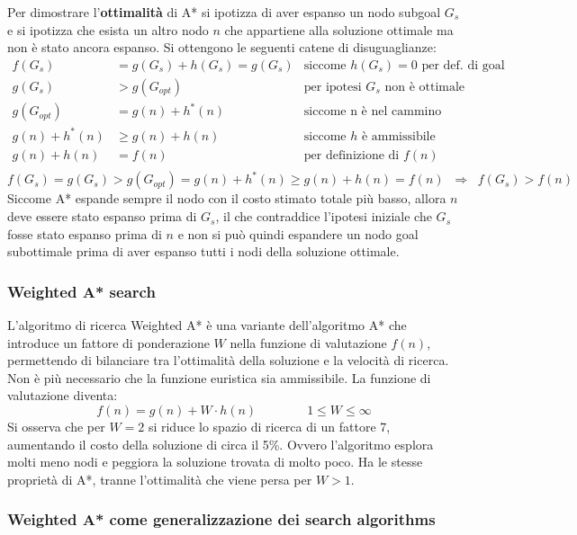 Per dimostrare l'\textbf{ottimalità} di A* si ipotizza di aver espanso un nodo subgoal \(G_s\) e si ipotizza che esista un altro
nodo \(n\) che appartiene alla soluzione ottimale ma non è stato ancora espanso. Si ottengono le seguenti catene di disuguaglianze:
\begin{align*}
	f(G_s) &= g(G_s) + h(G_s) = g(G_s) & \text{siccome \(h(G_s) = 0\) per def. di goal}\\
	g(G_s) &> g(G_{opt}) & \text{per ipotesi \(G_s\) non è ottimale} \\
	g(G_{opt}) &= g(n) + h^*(n) & \text{siccome n è nel cammino ottimo} \\
	g(n) + h^*(n) &\geq g(n) + h(n) & \text{siccome \(h\) è ammissibile} \\
	g(n) + h(n) &= f(n) & \text{per definizione di \(f(n)\)} \\
\end{align*}
\vspace*{-25pt}
\[f(G_s) = g(G_s) > g(G_{opt}) = g(n) + h^*(n) \geq g(n) + h(n) = f(n) \;\; \Rightarrow \;\; f(G_s) > f(n)\]
Siccome A* espande sempre il nodo con il costo stimato totale più basso, allora \(n\) deve essere stato espanso prima di
\(G_s\), il che contraddice l'ipotesi iniziale che \(G_s\) fosse stato espanso prima di \(n\) e non si può quindi
espandere un nodo goal subottimale prima di aver espanso tutti i nodi della soluzione ottimale.

\subsubsection*{Weighted A* search}
L'algoritmo di ricerca Weighted A* è una variante dell'algoritmo A* che introduce un fattore di ponderazione \(W\) nella
funzione di valutazione \(f(n)\), permettendo di bilanciare tra l'ottimalità della soluzione e la velocità di ricerca. Non è
più necessario che la funzione euristica sia ammissibile. La funzione di valutazione diventa:
\[f(n) = g(n) + W \cdot h(n) \qquad\qquad 1 \leq W \leq \infty\]
Si osserva che per \(W = 2\) si riduce lo spazio di ricerca di un fattore 7, aumentando il costo della soluzione di circa il
5\%. Ovvero l'algoritmo esplora molti meno nodi e peggiora la soluzione trovata di molto poco.
Ha le stesse proprietà di A*, tranne l'ottimalità che viene persa per \(W > 1\).

\subsubsection*{Weighted A* come generalizzazione dei search algorithms}

